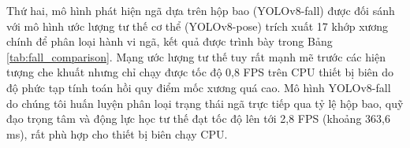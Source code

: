 \documentclass[12pt,a4paper]{article}
\begin{document}
\begin{table}[h]
    \centering
    \caption{So sánh các mô hình xác thực khuôn mặt trên phần cứng biên (CPU Mode)}
    \label{tab:face_comparison}
\end{table}

Thứ hai, mô hình phát hiện ngã dựa trên hộp bao (YOLOv8-fall) được đối sánh với mô hình ước lượng tư thế cơ thể (YOLOv8-pose) trích xuất 17 khớp xương chính để phân loại hành vi ngã, kết quả được trình bày trong Bảng \ref{tab:fall_comparison}.
Mạng ước lượng tư thế tuy rất mạnh mẽ trước các hiện tượng che khuất nhưng chỉ chạy được tốc độ 0,8 FPS trên CPU thiết bị biên do độ phức tạp tính toán hồi quy điểm mốc xương quá cao. Mô hình YOLOv8-fall do chúng tôi huấn luyện phân loại trạng thái ngã trực tiếp qua tỷ lệ hộp bao, quỹ đạo trọng tâm và động lực học tư thế đạt tốc độ lên tới 2,8 FPS (khoảng 363,6 ms), rất phù hợp cho thiết bị biên chạy CPU.

\begin{table}[h]
    \centering
    \caption{So sánh các mô hình phát hiện hành vi ngã trên phần cứng biên (CPU Mode)}
    \label{tab:fall_comparison}
\end{table}
\end{document}
